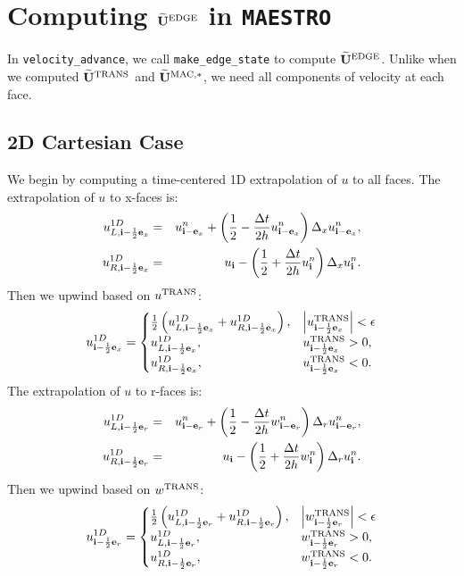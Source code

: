 \cleardoublepage

\section{Computing $\widetilde{{\bf U}}^{\rm EDGE}$ in {\tt MAESTRO}}
In {\tt velocity\_advance}, we call {\tt make\_edge\_state} to compute
$\widetilde{{\bf U}}^{\rm EDGE}$.  Unlike when we computed $\widetilde{{\bf U}}^{\rm TRANS}$ and
$\widetilde{{\bf U}}^{\rm MAC,*}$, we need all components of velocity at each face.

\subsection{2D Cartesian Case}
We begin by computing a time-centered 1D extrapolation of $u$ to all
faces.  The extrapolation of $u$ to x-faces is:
\begin{eqnarray}
u_{L,{\bf i}-\frac{1}{2}{\bf e}_x}^{1D} &=& u_{{\bf i}-{\bf e}_x}^n + \left(\frac{1}{2} - \frac{\Delta t}{2h}u_{{\bf i}-{\bf e}_x}^n\right)\Delta_x u_{{\bf i}-{\bf e}_x}^n, \\
u_{R,{\bf i}-\frac{1}{2}{\bf e}_x}^{1D} &=& u_{{\bf i}} - \left(\frac{1}{2} + \frac{\Delta t}{2h}u_{{\bf i}}^n\right)\Delta_x u_{{\bf i}}^n.
\end{eqnarray}
Then we upwind based on $u^{\rm TRANS}$:
\begin{equation}
u_{{\bf i}-\frac{1}{2}{\bf e}_x}^{1D} =
\begin{cases}
\frac{1}{2}\left(u_{L,{\bf i}-\frac{1}{2}{\bf e}_x}^{1D} + u_{R,{\bf i}-\frac{1}{2}{\bf e}_x}^{1D}\right), & \left|u^{\rm TRANS}_{{\bf i}-\frac{1}{2}{\bf e}_x}\right| < \epsilon \\
u_{L,{\bf i}-\frac{1}{2}{\bf e}_x}^{1D}, & u^{\rm TRANS}_{{\bf i}-\frac{1}{2}{\bf e}_x} > 0, \\
u_{R,{\bf i}-\frac{1}{2}{\bf e}_x}^{1D}, & u^{\rm TRANS}_{{\bf i}-\frac{1}{2}{\bf e}_x} < 0. \\
\end{cases}
\end{equation}
The extrapolation of $u$ to r-faces is:
\begin{eqnarray}
u_{L,{\bf i}-\frac{1}{2}{\bf e}_r}^{1D} &=& u_{{\bf i}-{\bf e}_r}^n + \left(\frac{1}{2} - \frac{\Delta t}{2h}w_{{\bf i}-{\bf e}_r}^n\right)\Delta_r u_{{\bf i}-{\bf e}_r}^n, \\
u_{R,{\bf i}-\frac{1}{2}{\bf e}_r}^{1D} &=& u_{{\bf i}} - \left(\frac{1}{2} + \frac{\Delta t}{2h}w_{{\bf i}}^n\right)\Delta_r u_{{\bf i}}^n.
\end{eqnarray}
Then we upwind based on $w^{\rm TRANS}$:
\begin{equation}
u_{{\bf i}-\frac{1}{2}{\bf e}_r}^{1D} =
\begin{cases}
\frac{1}{2}\left(u_{L,{\bf i}-\frac{1}{2}{\bf e}_r}^{1D} + u_{R,{\bf i}-\frac{1}{2}{\bf e}_r}^{1D}\right), & \left|w^{\rm TRANS}_{{\bf i}-\frac{1}{2}{\bf e}_r}\right| < \epsilon \\
u_{L,{\bf i}-\frac{1}{2}{\bf e}_r}^{1D}, & w^{\rm TRANS}_{{\bf i}-\frac{1}{2}{\bf e}_r} > 0, \\
u_{R,{\bf i}-\frac{1}{2}{\bf e}_r}^{1D}, & w^{\rm TRANS}_{{\bf i}-\frac{1}{2}{\bf e}_r} < 0. \\
\end{cases}
\end{equation}
